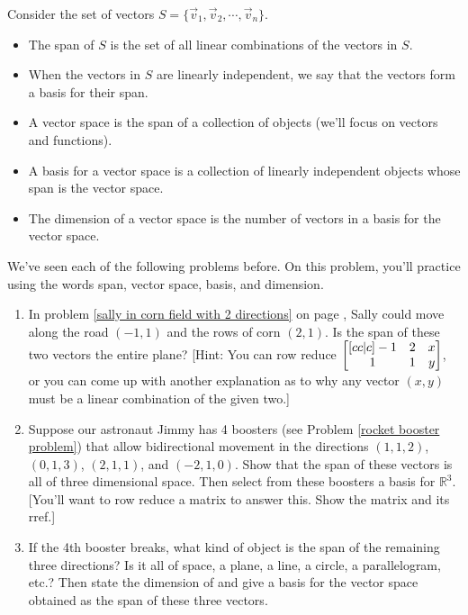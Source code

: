 \begin{definition}\label{definition span, vector space, dimension}
Consider the set of vectors $S = \{\vec v_1,\vec v_2,\cdots, \vec v_n\}$. 
\begin{itemize}
 \item  
The span of $S$ is the set of all linear combinations of the vectors in $S$. 
 \item 
When the vectors in $S$ are linearly independent, we say that the vectors form a basis for their span.   
 \item 
A vector space is the span of a collection of objects (we'll focus on vectors and functions).  
 \item 
A basis for a vector space is a collection of linearly independent objects whose span is the vector space. 
 \item 
The dimension of a vector space is the number of vectors in a basis for the vector space.
\end{itemize}
\end{definition}




\begin{problem}
We've seen each of the following problems before. On this problem, you'll practice using the words span, vector space, basis, and dimension. 
\begin{enumerate}
 \item In problem \ref{sally in corn field with 2 directions} on page \pageref{sally in corn field with 2 directions},  Sally could move along the road $(-1,1)$ and the rows of corn $(2,1)$. Is the span of these two vectors the entire plane? [Hint: You can row reduce $\begin{bmatrix} [cc|c]-1&2&x\\1&1&y \end{bmatrix}$, or you can come up with another explanation as to why any vector $(x,y)$ must be a linear combination of the given two.] 
 \item Suppose our astronaut Jimmy has 4 boosters (see Problem \ref{rocket booster problem}) that allow bidirectional movement in the directions $(1,1,2)$, $(0,1,3)$, $(2,1,1)$, and $(-2,1,0)$. Show that the span of these vectors is all of three dimensional space. Then select from these boosters a basis for $\mathbb{R}^3$. [You'll want to row reduce a matrix to answer this. Show the matrix and its rref.]
 \item If the 4th booster breaks, what kind of object is the span of the remaining three directions? Is it all of space, a plane, a line, a circle, a parallelogram, etc.?  Then state the dimension of and give a basis for the vector space obtained as the span of these three vectors.
\end{enumerate}
\end{problem}

